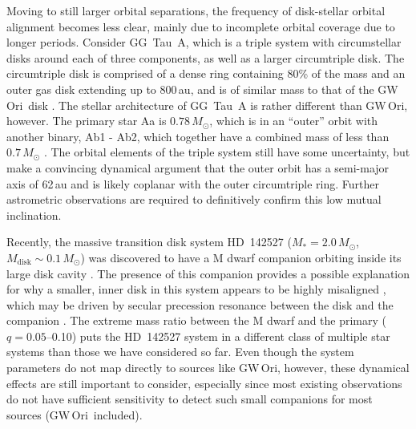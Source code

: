 \documentclass[twocolumn]{aastex61}
\newcommand{\obj}{GW\,Ori}
\begin{document}
Moving to still larger orbital separations, the frequency of disk-stellar orbital alignment becomes less clear, mainly due to incomplete orbital coverage due to longer periods. Consider GG~Tau~A, which is a triple system with circumstellar disks around each of three components, as well as a larger circumtriple disk. The circumtriple disk is comprised of a dense ring containing 80\% of the mass and an outer gas disk extending up to 800\,au, and is of similar mass to that of the \obj\ disk \citep[$0.12\,M_\odot$;][]{guilloteau99}. The stellar architecture of GG~Tau~A is rather different than \obj, however. The primary star Aa is $0.78\,M_\odot$, which is in an ``outer'' orbit with another binary, Ab1 - Ab2, which together have a combined mass of less than $0.7\,M_\odot$ \citep{dutrey16}. The orbital elements of the triple system still have some uncertainty, but \citet{nelson16} make a convincing dynamical argument that the outer orbit has a semi-major axis of 62\,au and is likely coplanar with the outer circumtriple ring. Further astrometric observations are required to definitively confirm this low mutual inclination.

Recently, the massive transition disk system HD~142527 ($M_\ast = 2.0\,M_\odot$, $M_\mathrm{disk} \sim 0.1\,M_\odot$) was discovered to have a M dwarf companion orbiting inside its large disk cavity \citep{biller12,lacour16}. The presence of this companion provides a possible explanation for why a smaller, inner disk in this system appears to be highly misaligned \citep[$\sim 70^\circ$][]{avenhaus14,marino15}, which may be driven by secular precession resonance between the disk and the companion \citep{owen17}.
The extreme mass ratio between the M dwarf and the primary ($q = 0.05$--0.10) puts the HD~142527 system in a different class of multiple star systems than those we have considered so far. Even though the system parameters do not map directly to sources like \obj, however, these dynamical effects are still important to consider, especially since most existing observations do not have sufficient sensitivity to detect such small companions for most sources (\obj\ included).
\end{document}
